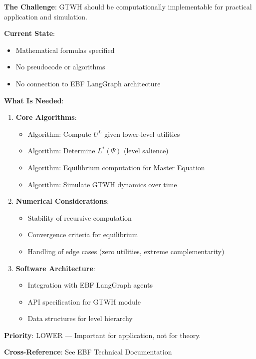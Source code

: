 \begin{tcolorbox}[colback=green!5!white, colframe=green!75!black, title=Status: Informal Only]
\textbf{The Challenge}: GTWH should be computationally implementable for 
practical application and simulation.

\textbf{Current State}: 
\begin{itemize}[nosep]
\item Mathematical formulas specified
\item No pseudocode or algorithms
\item No connection to EBF LangGraph architecture
\end{itemize}

\textbf{What Is Needed}:
\begin{enumerate}
\item \textbf{Core Algorithms}:
    \begin{itemize}[nosep]
    \item Algorithm: Compute $U^L$ given lower-level utilities
    \item Algorithm: Determine $L^*(\Psi)$ (level salience)
    \item Algorithm: Equilibrium computation for Master Equation
    \item Algorithm: Simulate GTWH dynamics over time
    \end{itemize}

\item \textbf{Numerical Considerations}:
    \begin{itemize}[nosep]
    \item Stability of recursive computation
    \item Convergence criteria for equilibrium
    \item Handling of edge cases (zero utilities, extreme complementarity)
    \end{itemize}

\item \textbf{Software Architecture}:
    \begin{itemize}[nosep]
    \item Integration with EBF LangGraph agents
    \item API specification for GTWH module
    \item Data structures for level hierarchy
    \end{itemize}
\end{enumerate}

\textbf{Priority}: \colorbox{green!20}{LOWER} --- Important for application, not for theory.

\textbf{Cross-Reference}: See EBF Technical Documentation
\end{tcolorbox}

